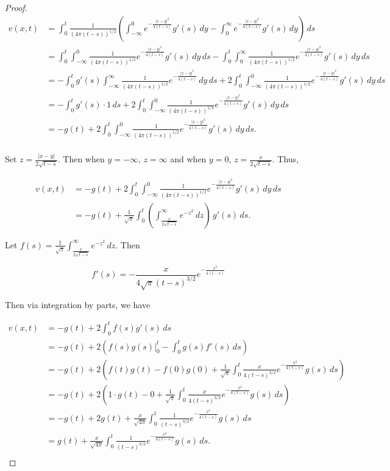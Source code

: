 \documentclass[11pt,oneside,english]{amsart}
\theoremstyle{definition}
\begin{document}
\begin{enumerate}
\begin{proof}
\begin{align*}
v(x,t)&=\int_0^t\frac{1}{(4\pi(t-s))^{1/2}}\left(\int_{-\infty}^0 e^{-\frac{|x-y|^2}{4(t-s)}}g'(s)\,dy-\int_0^\infty e^{-\frac{|x-y|^2}{4(t-s)}}g'(s)\,dy\right)\,ds\\[2mm]
&=\int_0^t\int_{-\infty}^0\frac{1}{(4\pi(t-s))^{1/2}} e^{-\frac{|x-y|^2}{4(t-s)}}g'(s)\,dy\,ds-\int_0^t\int_0^\infty \frac{1}{(4\pi(t-s))^{1/2}} e^{-\frac{|x-y|^2}{4(t-s)}}g'(s)\,dy\,ds\\[2mm]
&=-\int_0^tg'(s)\int_{-\infty}^\infty \frac{1}{(4\pi(t-s))^{1/2}}e^{-\frac{|x-y|^2}{4(t-s)}}\,dy\,ds+2\int_0^t\int_{-\infty}^0\frac{1}{(4\pi(t-s))^{1/2}}e^{-\frac{|x-y|^2}{4(t-s)}}g'(s)\,dy\,ds\\[2mm]
&=-\int_0^tg'(s)\cdot1\,ds+2\int_0^t\int_{-\infty}^0\frac{1}{(4\pi(t-s))^{1/2}}e^{-\frac{|x-y|^2}{4(t-s)}}g'(s)\,dy\,ds\\[2mm]
&=-g(t)+2\int_0^t\int_{-\infty}^0\frac{1}{(4\pi(t-s))^{1/2}}e^{-\frac{|x-y|^2}{4(t-s)}}g'(s)\,dy\,ds.\\[2mm]
\end{align*}

Set $\displaystyle z=\frac{|x-y|}{2\sqrt{t-s}}$. Then when $y=-\infty$, $z=\infty$ and when $y=0$, $z=\frac{x}{2\sqrt{t-s}}$. Thus, 

\begin{align*}
v(x,t)&=-g(t)+2\int_0^t\int_{-\infty}^0\frac{1}{(4\pi(t-s))^{1/2}}e^{-\frac{|x-y|^2}{4(t-s)}}g'(s)\,dy\,ds\\[2mm]
&=-g(t)+\frac{1}{\sqrt{\pi}}\int_0^t\left(\int_{\frac{x}{2\sqrt{t-s}}}^\infty e^{-z^2}\,dz\right)\,g'(s)\,ds.
\end{align*}

Let $\displaystyle f(s)=\frac{1}{\sqrt{\pi}}\int_{\frac{x}{2\sqrt{t-s}}}^\infty e^{-z^2}\,dz$. Then

\[
f'(s)=-\frac{x}{4\sqrt{\pi}(t-s)^{3/2}}e^{-\frac{x^2}{4(t-s)}}
\]



Then via integration by parts, we have

\begin{align*}
v(x,t)&=-g(t)+2\int_0^tf(s)g'(s)\,ds\\[2mm]
&=-g(t)+2\left(\left.f(s)g(s)\right|_0^t-\int_0^tg(s)f'(s)\,ds\right)\\[2mm]
&=-g(t)+2\left(f(t)g(t)-f(0)g(0)+\frac{1}{\sqrt{\pi}}\int_0^t\frac{x}{4(t-s)^{3/2}}e^{-\frac{x^2}{4(t-s)}}g(s)\,ds\right)\\[2mm]
&=-g(t)+2\left(1\cdot g(t)-0+\frac{1}{\sqrt{\pi}}\int_0^t\frac{x}{4(t-s)^{3/2}}e^{-\frac{x^2}{4(t-s)}}g(s)\,ds\right)\\[2mm]
&=-g(t)+2g(t)+\frac{x}{\sqrt{4\pi}}\int_0^t\frac{1}{(t-s)^{3/2}}e^{-\frac{x^2}{4(t-s)}}g(s)\,ds\\[2mm]
&=g(t)+\frac{x}{\sqrt{4\pi}}\int_0^t\frac{1}{(t-s)^{3/2}}e^{-\frac{x^2}{4(t-s)}}g(s)\,ds.\\[2mm]
\end{align*}


\end{proof}
\end{enumerate}
\end{document}
